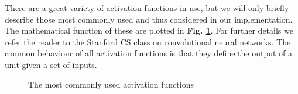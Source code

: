 \noindent There are a great variety of activation functions in use, but we will only briefly describe those most commonly used and thus considered in our implementation. The mathematical function of these are plotted in \textbf{Fig. \ref{activationfuncs}}. For further details we refer the reader to the Stanford CS class on convolutional neural networks\cite{cs231n_part1}. The common behaviour of all activation functions is that they define the output of a unit given a set of inputs. \\
\begin{figure}[H]
    \begin{minipage}{0.3\textwidth}
    \end{minipage}
    \begin{minipage}{0.3\textwidth}
    \end{minipage}
    \begin{minipage}{0.3\textwidth}
    \end{minipage}
    \caption{The most commonly used activation functions}
    \label{activationfuncs}
\end{figure}

